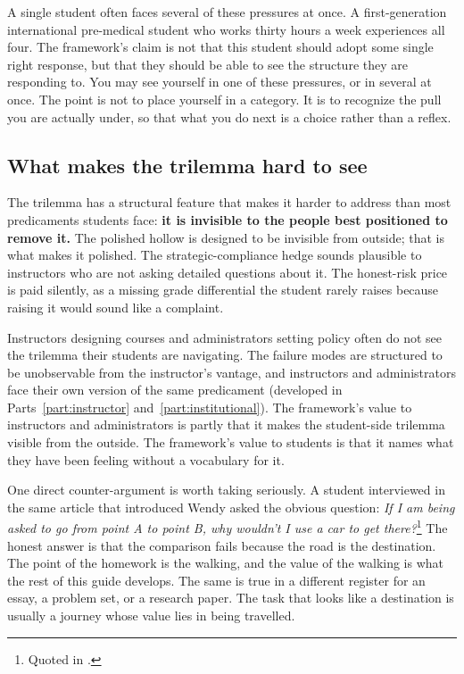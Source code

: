 \documentclass{SIAMbook2023}
\begin{document}
A single student often faces several of these pressures at once. A first-generation international pre-medical student who works thirty hours a week experiences all four. The framework's claim is not that this student should adopt some single right response, but that they should be able to see the structure they are responding to. You may see yourself in one of these pressures, or in several at once. The point is not to place yourself in a category. It is to recognize the pull you are actually under, so that what you do next is a choice rather than a reflex.

\subsection{What makes the trilemma hard to see}
\label{subsec:trilemma-invisibility}

The trilemma has a structural feature that makes it harder to address than most predicaments students face: \textbf{it is invisible to the people best positioned to remove it.} The polished hollow is designed to be invisible from outside; that is what makes it polished. The strategic-compliance hedge sounds plausible to instructors who are not asking detailed questions about it. The honest-risk price is paid silently, as a missing grade differential the student rarely raises because raising it would sound like a complaint.

Instructors designing courses and administrators setting policy often do not see the trilemma their students are navigating. The failure modes are structured to be unobservable from the instructor's vantage, and instructors and administrators face their own version of the same predicament (developed in Parts~\ref{part:instructor} and~\ref{part:institutional}). The framework's value to instructors and administrators is partly that it makes the student-side trilemma visible from the outside. The framework's value to students is that it names what they have been feeling without a vocabulary for it.

One direct counter-argument is worth taking seriously. A student interviewed in the same article that introduced Wendy asked the obvious question: \emph{If I am being asked to go from point A to point B, why wouldn't I use a car to get there?}\footnote{Quoted in \citet{walsh2025everyone}.} The honest answer is that the comparison fails because the road is the destination. The point of the homework is the walking, and the value of the walking is what the rest of this guide develops. The same is true in a different register for an essay, a problem set, or a research paper. The task that looks like a destination is usually a journey whose value lies in being travelled.
\end{document}
